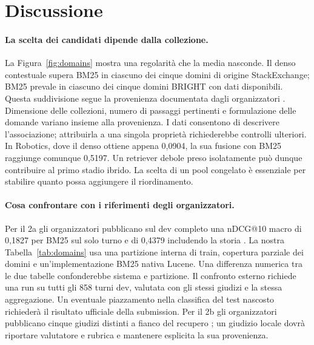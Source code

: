 \section{Discussione}
\paragraph{La scelta dei candidati dipende dalla collezione.}
La Figura~\ref{fig:domains} mostra una regolarità che la media nasconde. Il denso contestuale supera BM25 in ciascuno dei cinque domini di origine StackExchange; BM25 prevale in ciascuno dei cinque domini BRIGHT con dati disponibili. Questa suddivisione segue la provenienza documentata dagli organizzatori \cite{data}. Dimensione delle collezioni, numero di passaggi pertinenti e formulazione delle domande variano insieme alla provenienza. I dati consentono di descrivere l'associazione; attribuirla a una singola proprietà richiederebbe controlli ulteriori. In Robotics, dove il denso ottiene appena 0,0904, la sua fusione con BM25 raggiunge comunque 0,5197. Un retriever debole preso isolatamente può dunque contribuire al primo stadio ibrido. La scelta di un pool congelato è essenziale per stabilire quanto possa aggiungere il riordinamento.

\paragraph{Cosa confrontare con i riferimenti degli organizzatori.}
Per il 2a gli organizzatori pubblicano sul dev completo una nDCG@10 macro di 0,1827 per BM25 sul solo turno e di 0,4379 includendo la storia \cite{data}. La nostra Tabella~\ref{tab:domains} usa una partizione interna di train, copertura parziale dei domini e un'implementazione BM25 nativa Lucene. Una differenza numerica tra le due tabelle confonderebbe sistema e partizione. Il confronto esterno richiede una run su tutti gli 858 turni dev, valutata con gli stessi giudizi e la stessa aggregazione. Un eventuale piazzamento nella classifica del test nascosto richiederà il risultato ufficiale della submission. Per il 2b gli organizzatori pubblicano cinque giudizi distinti a fianco del recupero \cite{evaluation}; un giudizio locale dovrà riportare valutatore e rubrica e mantenere esplicita la sua provenienza.

